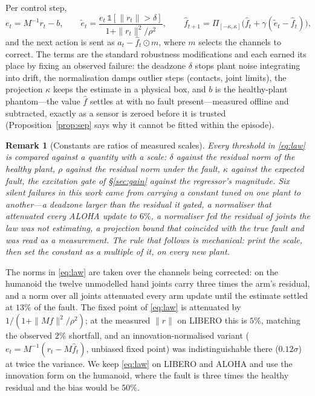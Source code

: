 \documentclass{article}
\newtheorem{remark}{Remark}
\newcommand{\fhat}{\hat{f}}
\begin{document}
Per control step,
\begin{equation}
\label{eq:law}
e_t = M^{-1} r_t - b,\qquad
\tilde e_t = \frac{e_t\,\mathbb{1}[\|r_t\|>\delta]}{1+\|r_t\|^2/\rho^2},\qquad
\fhat_{t+1} = \Pi_{[-\kappa,\kappa]}\!\big(\fhat_t + \gamma(\tilde e_t - \fhat_t)\big),
\end{equation}
and the next action is sent as $a_t - \fhat_t \odot m$, where $m$ selects the channels to
correct. The terms are the standard robustness modifications and each earned its place by
fixing an observed failure: the deadzone $\delta$ stops plant noise integrating into drift,
the normalisation damps outlier steps (contacts, joint limits), the projection $\kappa$ keeps
the estimate in a physical box, and $b$ is the healthy-plant phantom---the value $\fhat$
settles at with no fault present---measured offline and subtracted, exactly as a sensor is
zeroed before it is trusted (Proposition~\ref{prop:sep} says why it cannot be fitted
within the episode).

\begin{remark}[Constants are ratios of measured scales]
\label{rem:scale}
Every threshold in \eqref{eq:law} is compared against a quantity with a scale: $\delta$
against the residual norm of the healthy plant, $\rho$ against the residual norm under the
fault, $\kappa$ against the expected fault, the excitation gate of \S\ref{sec:gain} against
the regressor's magnitude. Six silent failures in this work came from carrying a constant
tuned on one plant to another---a deadzone larger than the residual it gated, a normaliser
that attenuated every ALOHA update to $6\%$, a normaliser fed the residual of joints the law
was not estimating, a projection bound that coincided with the true fault and was read as a
measurement. The rule that follows is mechanical: print the scale,
then set the constant as a multiple of it, on every new plant.
\end{remark}

The norms in \eqref{eq:law} are taken over the channels being corrected: on the humanoid
the twelve unmodelled hand joints carry three times the arm's residual, and a norm over all
joints attenuated every arm update until the estimate settled at $13\%$ of the fault. The
fixed point of \eqref{eq:law} is attenuated by $1/(1+\|Mf\|^2/\rho^2)$; at the measured
$\|r\|$ on LIBERO this is $5\%$, matching the observed $2\%$ shortfall, and an
innovation-normalised variant ($e_t = M^{-1}(r_t - M\fhat_t)$, unbiased fixed point) was
indistinguishable there ($0.12\sigma$) at twice the variance. We keep \eqref{eq:law} on
LIBERO and ALOHA and use the innovation form on the humanoid, where the fault is three
times the healthy residual and the bias would be $50\%$.
\end{document}
